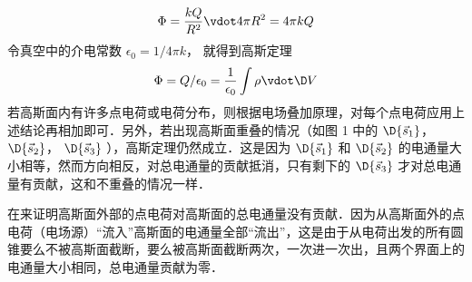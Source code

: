 \begin{enumerate}
\begin{equation}
\Phi  = \frac{{kQ}}{{{R^2}}} \vdot 4\pi {R^2} = 4\pi kQ
\end{equation} 
令真空中的介电常数 ${\epsilon _0} = {1}/{{4\pi k}}$， 就得到高斯定理
\begin{equation}
\Phi  = Q/{\epsilon _0} = \frac{1}{{{\epsilon _0}}}\int {\rho  \vdot \D V} 
\end{equation} 
若高斯面内有许多点电荷或电荷分布，则根据电场叠加原理，对每个点电荷应用上述结论再相加即可．另外，若出现高斯面重叠的情况（如图 1 中的 $\D {\vec s_1}$，  $\D {\vec s_2}$，  $\D {\vec s_3}$ ），高斯定理仍然成立．这是因为 $\D {\vec s_1}$ 和 $\D {\vec s_2}$ 的电通量大小相等，然而方向相反，对总电通量的贡献抵消，只有剩下的 $\D {\vec s_3}$ 才对总电通量有贡献，这和不重叠的情况一样．

在来证明高斯面外部的点电荷对高斯面的总电通量没有贡献．因为从高斯面外的点电荷（电场源）“流入”高斯面的电通量全部“流出”，这是由于从电荷出发的所有圆锥要么不被高斯面截断，要么被高斯面截断两次，一次进一次出，且两个界面上的电通量大小相同，总电通量贡献为零．
\end{enumerate}
 
 
 
 
 
 
 
 
 